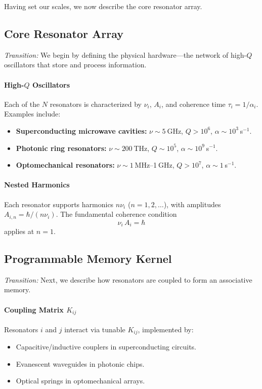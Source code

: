 \bigskip
Having set our scales, we now describe the core resonator array.

\subsection{Core Resonator Array}
\emph{Transition:} We begin by defining the physical hardware—the network of high-\(Q\) oscillators that store and process information.

\paragraph{High-\(Q\) Oscillators}  
Each of the \(N\) resonators is characterized by \(\nu_i\), \(A_i\), and coherence time \(\tau_i = 1/\alpha_i\).  Examples include:
\begin{itemize}
  \item \textbf{Superconducting microwave cavities:} \(\nu\sim5\) GHz, \(Q>10^6\), \(\alpha\sim10^3\) s\(^{-1}\).
  \item \textbf{Photonic ring resonators:} \(\nu\sim200\) THz, \(Q\sim10^5\), \(\alpha\sim10^9\) s\(^{-1}\).
  \item \textbf{Optomechanical resonators:} \(\nu\sim1\) MHz–1 GHz, \(Q>10^7\), \(\alpha\sim1\) s\(^{-1}\).
\end{itemize}

\paragraph{Nested Harmonics}  
Each resonator supports harmonics \(n\nu_i\) (\(n=1,2,\dots\)), with amplitudes \(A_{i,n} = \hbar/(n\nu_i)\).  The fundamental coherence condition
\[
\nu_{i}\,A_{i} = \hbar
\]
applies at \(n=1\).

\subsection{Programmable Memory Kernel}
\emph{Transition:} Next, we describe how resonators are coupled to form an associative memory.

\paragraph{Coupling Matrix \(K_{ij}\)}  
Resonators \(i\) and \(j\) interact via tunable \(K_{ij}\), implemented by:
\begin{itemize}
  \item Capacitive/inductive couplers in superconducting circuits.
  \item Evanescent waveguides in photonic chips.
  \item Optical springs in optomechanical arrays.
\end{itemize}

